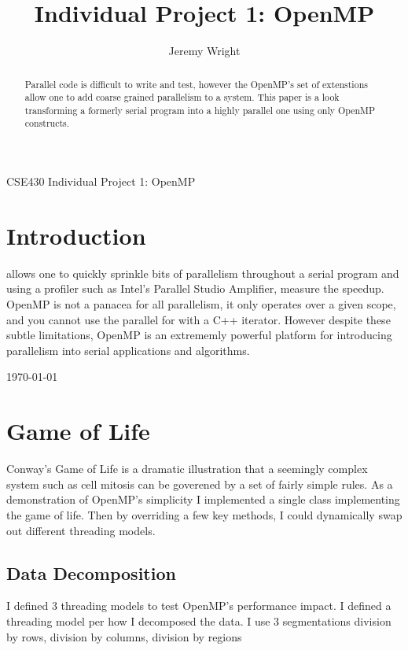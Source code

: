 \documentclass[journal,10pt,onecolumn,draftcls]{IEEEtran}
\begin{document}
%
\title{Individual Project 1: OpenMP}
%

\author{Jeremy Wright}

{CSE430 Individual Project 1: OpenMP}

\maketitle


\begin{abstract}
Parallel code is difficult to write and test, however the OpenMP's set of 
extenstions allow one to add coarse grained parallelism to a system. This paper 
is a look transforming a formerly serial program into a highly parallel one using 
only OpenMP constructs.
\end{abstract}

\IEEEpeerreviewmaketitle

\section{Introduction}

 allows one to quickly sprinkle bits of parallelism throughout
a serial program and using a profiler such as Intel's Parallel Studio Amplifier, measure 
the speedup.  OpenMP is not a panacea for all parallelism, it only operates over a given 
scope, and you cannot use the parallel for with a C++ iterator.  However despite these 
subtle limitations, OpenMP is an extrememly powerful platform for introducing parallelism
into serial applications and algorithms.

\hfill \today

\section{Game of Life}
Conway's Game of Life is a dramatic illustration that a seemingly complex system
such as cell mitosis can be goverened by a set of fairly simple rules. As a demonstration of
OpenMP's simplicity I implemented a single class implementing the game of life. Then by 
overriding a few key methods, I could dynamically swap out different threading models.

\subsection{Data Decomposition}
I defined 3 threading models to test OpenMP's performance impact. I defined a threading model
per how I decomposed the data.  I use 3 segmentations division by rows, division by columns, 
division by regions
\end{document}
